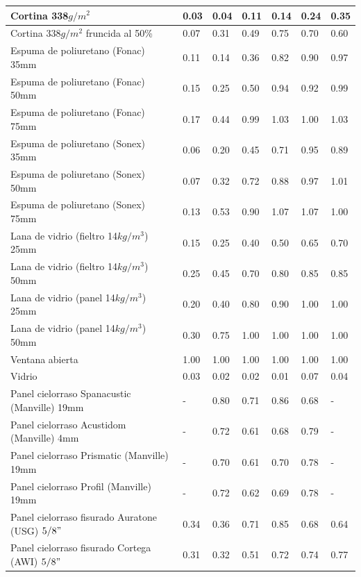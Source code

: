 \begin{center}
\begin{longtable}[!htb]{| m{22em} | m{2.5em} | m{2.5em} | m{2.5em} | m{2.5em} | m{2.5em} |m{2.5em} |}
    \hline 
    Cortina 338$g/m^2$ & 0.03 & 0.04 & 0.11 & 0.14 & 0.24 & 0.35\\
    \hline
    Cortina 338$g/m^2$ fruncida al 50\% & 0.07 & 0.31 & 0.49 & 0.75 & 0.70 & 0.60\\
    \hline
    Espuma de poliuretano (Fonac) 35mm & 0.11 & 0.14 & 0.36 & 0.82 & 0.90 & 0.97\\
    \hline
    Espuma de poliuretano (Fonac) 50mm & 0.15 & 0.25 & 0.50 & 0.94 & 0.92 & 0.99\\
    \hline
    Espuma de poliuretano (Fonac) 75mm & 0.17 & 0.44 & 0.99 & 1.03 & 1.00 & 1.03\\
    \hline
    Espuma de poliuretano (Sonex) 35mm & 0.06 & 0.20 & 0.45 & 0.71 & 0.95 & 0.89\\
    \hline
    Espuma de poliuretano (Sonex) 50mm & 0.07 & 0.32 & 0.72 & 0.88 & 0.97 & 1.01\\
    \hline
    Espuma de poliuretano (Sonex) 75mm & 0.13 & 0.53 & 0.90 & 1.07 & 1.07 & 1.00\\
    \hline
    Lana de vidrio (fieltro 14$kg/m^3$) 25mm & 0.15 & 0.25 & 0.40 & 0.50 & 0.65 & 0.70\\
    \hline
    Lana de vidrio (fieltro 14$kg/m^3$) 50mm & 0.25 & 0.45 & 0.70 & 0.80 & 0.85 & 0.85\\
    \hline
    Lana de vidrio (panel 14$kg/m^3$) 25mm & 0.20 & 0.40 & 0.80 & 0.90 & 1.00 & 1.00\\
    \hline
    Lana de vidrio (panel 14$kg/m^3$) 50mm & 0.30 & 0.75 & 1.00 & 1.00 & 1.00 & 1.00\\
    \hline
    Ventana abierta & 1.00 & 1.00 & 1.00 & 1.00 & 1.00 & 1.00\\
    \hline
    Vidrio & 0.03 & 0.02 & 0.02 & 0.01 & 0.07 & 0.04\\
    \hline
    Panel cielorraso Spanacustic (Manville) 19mm & - & 0.80 & 0.71 & 0.86 & 0.68 & -\\
    \hline
    Panel cielorraso Acustidom (Manville) 4mm & - & 0.72 & 0.61 & 0.68 & 0.79 & -\\
    \hline
    Panel cielorraso Prismatic (Manville) 19mm & - & 0.70 & 0.61 & 0.70 & 0.78 & -\\
    \hline
    Panel cielorraso Profil (Manville) 19mm & - & 0.72 & 0.62 & 0.69 & 0.78 & -\\
    \hline
    Panel cielorraso fisurado Auratone (USG) $5/8"$ & 0.34 & 0.36 & 0.71 & 0.85 & 0.68 & 0.64\\
    \hline
    Panel cielorraso fisurado Cortega (AWI) $5/8"$ & 0.31 & 0.32 & 0.51 & 0.72 & 0.74 & 0.77\\

\end{longtable}
\end{center}
